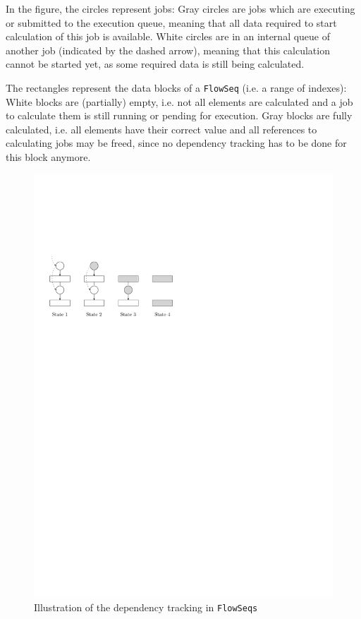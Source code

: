 \documentclass[runningheads,a4paper,fleqn]{llncs}
\begin{document}
In the figure, the circles represent jobs: Gray circles are jobs which 
are executing or submitted to the execution queue, meaning that all 
data required to start calculation of this job is available. White
circles are in an internal queue of another job (indicated by the dashed
arrow), meaning that this calculation cannot be started yet, as some
required data is still being calculated.

The rectangles represent the data blocks of a \texttt{FlowSeq} (i.e. a range
of indexes): White blocks are (partially) empty, i.e. not all elements
are calculated and a job to calculate them is still running or pending
for execution. Gray blocks are fully calculated, i.e. all elements
have their correct value and all references to calculating jobs may be
freed, since no dependency tracking has to be done for this block
anymore.

\begin{figure}
  \centering
  \includegraphics{dependency-tracking}
  \caption{Illustration of the dependency tracking in \texttt{FlowSeqs}}
  \label{fig:dep-track}
\end{figure}
\end{document}
